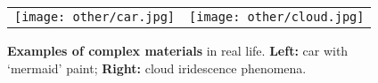 \begin{figure}[!ht]
	\centering
	\setlength{\resLen}{3.in}
	\addtolength{\tabcolsep}{0pt}
	\begin{tabular}{cc}
		\texttt{[image: other/car.jpg]} & 
		\texttt{[image: other/cloud.jpg]} 
	\end{tabular}
	\caption[Examples of complex materials]{\label{fig:introduction:material}
		\textbf{Examples of complex materials} in real life.
		\textbf{Left:} car with `mermaid' paint; \textbf{Right:} cloud iridescence phenomena.
	}
\end{figure}